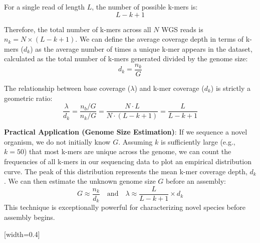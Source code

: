 For a single read of length $L$, the number of possible k-mers is:
\[ L - k + 1 \]

Therefore, the total number of k-mers across all $N$ WGS reads is $n_k = N \times (L - k + 1)$. We can define the average coverage depth in terms of k-mers ($d_k$) as the average number of times a unique k-mer appears in the dataset, calculated as the total number of k-mers generated divided by the genome size:
\[ d_k = \frac{n_k}{G} \]

The relationship between base coverage ($\lambda$) and k-mer coverage ($d_k$) is strictly a geometric ratio:
\[ \frac{\lambda}{d_k} = \frac{n_b / G}{n_k / G} = \frac{N \cdot L}{N \cdot (L - k + 1)} = \frac{L}{L - k + 1} \]

\sta \textbf{Practical Application (Genome Size Estimation)}: If we sequence a novel organism, we do not initially know $G$. Assuming $k$ is sufficiently large (e.g., $k=50$) that most k-mers are unique across the genome, we can count the frequencies of all k-mers in our sequencing data to plot an empirical distribution curve. The peak of this distribution represents the mean k-mer coverage depth, $d_k$. We can then estimate the unknown genome size $G$ before an assembly:
\[ G \approx \frac{n_k}{d_k} \quad \text{and} \quad \lambda \approx \frac{L}{L - k + 1} \times d_k \]
This technique is exceptionally powerful for characterizing novel species before assembly begins.

[width=0.4\textwidth]

